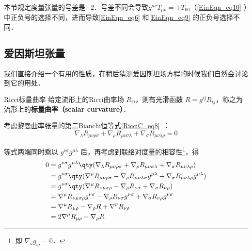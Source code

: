 

本节规定度量张量的号差是$-2$．号差不同会导致$g^{\mu\nu}T_{\mu\nu}=\pm T_{00}$（\autoref{EinEqn_eq10} ）中正负号的选择不同，进而导致\autoref{EinEqn_eq6} 和\autoref{EinEqn_eq9} 的正负号选择不同．

\subsection{爱因斯坦张量}

我们直接介绍一个有用的性质，在稍后猜测爱因斯坦场方程的时候我们自然会讨论到它的用处．

\begin{definition}{Ricci标量曲率}
给定流形上的Ricci曲率场 $R_{ij}$，则有光滑函数 $R=g^{ij}R_{ij}$，称之为流形上的\textbf{标量曲率（scalar curvature）}．
\end{definition}

考虑黎曼曲率张量的第二Bianchi恒等式\autoref{RicciC_eq8}~：
\begin{equation}
\nabla_\lambda R_{\mu\nu\rho\sigma}+\nabla_\rho R_{\mu\nu\sigma\lambda}+\nabla_\sigma R_{\mu\nu\lambda\rho}=0
\end{equation}

等式两端同时乘以 $g^{\nu\sigma}g^{\mu\lambda}$ 后，再考虑到联络对度量的相容性\footnote{即 $\nabla_ag_{ij}=0$．}，得
\begin{equation}
\begin{aligned}
0&=g^{\nu\sigma}g^{\mu\lambda}\qty(\nabla_\lambda R_{\mu\nu\rho\sigma}+\nabla_\rho R_{\mu\nu\sigma\lambda}+\nabla_\sigma R_{\mu\nu\lambda\rho})\\
&=g^{\nu\sigma}\qty(\nabla^\mu R_{\mu\nu\rho\sigma} - \nabla_\rho R_{\mu\nu\lambda\sigma}g^{\mu\lambda} + \nabla_\sigma R_{\mu\nu\lambda\rho}g^{\mu\lambda})\\
&=g^{\nu\sigma}\qty(\nabla^\mu R_{\nu\mu\sigma\rho} - \nabla_\rho R_{\nu\sigma} + \nabla_\sigma R_{\nu\rho})\\
&=\nabla^\mu R_{\nu\mu\sigma\rho}g^{\nu\sigma} - \nabla_\rho R_{\nu\sigma}g^{\nu\sigma} + \nabla_\sigma R_{\nu\rho}g^{\nu\sigma}\\
&=\nabla^\mu R_{\mu\rho} - \nabla_\rho R + \nabla^\nu R_{\nu\rho}\\
&=2\nabla^\mu R_{\mu\rho} - \nabla_\rho R
\end{aligned}
\end{equation}

